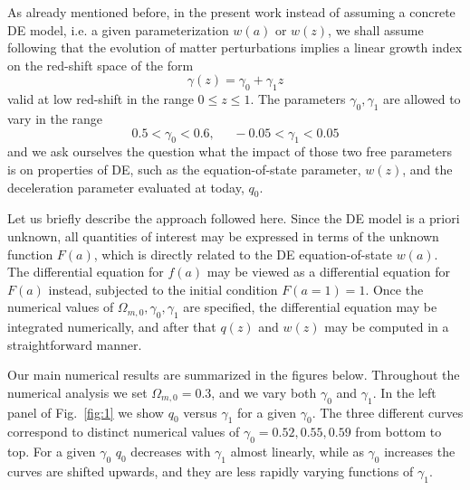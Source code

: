 \documentclass[aps,prd,amsmath,amssymb]{revtex4}
\begin{document}
As already mentioned before, in the present work instead of assuming a concrete DE model, i.e. a given parameterization
$w(a)$ or $w(z)$, we shall assume following \cite{radouane,leandros2} that the evolution of matter perturbations implies a linear growth index on the red-shift space of the form
\begin{equation}
\gamma(z) = \gamma_0 + \gamma_1 z
\end{equation}
valid at low red-shift in the range $0 \leq z \leq 1$. The parameters $\gamma_0,\gamma_1$ are allowed to vary in 
the range \cite{radouane}
\begin{equation}
0.5 < \gamma_0 < 0.6, \; \; \; \; \; -0.05 < \gamma_1 < 0.05
\end{equation}
and we ask ourselves the question what the impact of those two free parameters is on properties of DE, such as the equation-of-state parameter, $w(z)$, and the deceleration parameter evaluated at today, $q_0$.

\smallskip

Let us briefly describe the approach followed here. Since the DE model is a priori unknown, all quantities of interest may be expressed in terms of the unknown function $F(a)$, which is directly related to the DE equation-of-state $w(a)$. The differential equation for $f(a)$ may be viewed as a differential equation for $F(a)$ instead, subjected to the initial condition $F(a=1)=1$. Once the numerical values of 
$\Omega_{m,0},\gamma_0,\gamma_1$ are specified, the differential equation may be integrated numerically, and after that $q(z)$ and $w(z)$ may be computed in a straightforward manner. 

\smallskip

Our main numerical results are summarized in the figures below. Throughout the numerical analysis we set 
$\Omega_{m,0}=0.3$, and we vary both $\gamma_0$ and $\gamma_1$. In the left panel of Fig.~\ref{fig:1} we show
$q_0$ versus $\gamma_1$ for a given $\gamma_0$. The three different curves correspond to distinct numerical values of 
$\gamma_0=0.52,0.55,0.59$ from bottom to top. For a given $\gamma_0$ $q_0$ decreases with $\gamma_1$ almost linearly, 
while as $\gamma_0$ increases the curves are shifted upwards, and they are less rapidly varying functions of $\gamma_1$.

\smallskip
\end{document}
